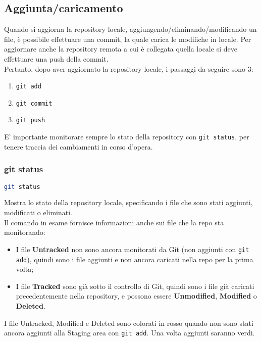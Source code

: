 \subsection{Aggiunta/caricamento}
Quando si aggiorna la repository locale, aggiungendo/eliminando/modificando un file, è possibile effettuare una commit, la quale carica le modifiche in locale. Per aggiornare anche la repository remota a cui è collegata quella locale si deve effettuare una push della commit.\\
Pertanto, dopo aver aggiornato la repository locale, i passaggi da seguire sono 3:
\begin{center}
\begin{minipage}{0.5\textwidth}
\begin{tcolorbox}[left=0cm, colframe=red!50!gray]
\begin{enumerate}[noitemsep, topsep=0pt]
	\item \texttt{git add}
	\item \texttt{git commit}
	\item \texttt{git push}
\end{enumerate}
\end{tcolorbox}
\end{minipage}
\end{center}
E' importante monitorare sempre lo stato della repository con \texttt{git status}, per tenere traccia dei cambiamenti in corso d'opera.

\subsubsection{git status}
\begin{lstlisting}[language=bash]
	git status
\end{lstlisting}
Mostra lo stato della repository locale, specificando i file che sono stati aggiunti, modificati o eliminati.\\
Il comando in esame fornisce informazioni anche sui file che la repo sta monitorando:
\begin{itemize}[noitemsep, topsep=3pt]
	\item I file \textbf{\color{red}Untracked} non sono ancora monitorati da Git (non aggiunti con \texttt{git add}), quindi sono i file aggiunti e non ancora caricati nella repo per la prima volta;
	\item I file \textbf{Tracked} sono già sotto il controllo di Git, quindi sono i file già caricati precedentemente nella repository, e possono essere \textbf{Unmodified}, \textbf{\color{red}Modified} o \textbf{\color{red}Deleted}.
\end{itemize}
I file Untracked, Modified e Deleted sono colorati in rosso quando non sono stati ancora aggiunti alla Staging area con \texttt{git add}. Una volta aggiunti saranno verdi.

